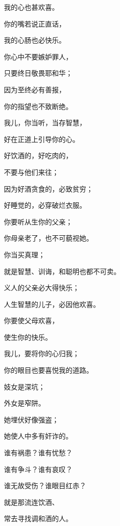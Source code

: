 {\par }{\Q 我的心也甚欢喜。
\par }{\Q {}你的嘴若说正直话，
\par }{\Q 我的心肠也必快乐。
\par }{\BB \par }{\Q {}你心中不要嫉妒罪人，
\par }{\Q 只要终日敬畏耶和华；
\par }{\Q {}因为至终必有善报，
\par }{\Q 你的指望也不致断绝。
\par }{\BB \par }{\Q {}我儿，你当听，当存智慧，
\par }{\Q 好在正道上引导你的心。
\par }{\Q {}好饮酒的，好吃肉的，
\par }{\Q 不要与他们来往；
\par }{\Q {}因为好酒贪食的，必致贫穷；
\par }{\Q 好睡觉的，必穿破烂衣服。
\par }{\BB \par }{\Q {}你要听从生你的父亲；
\par }{\Q 你母亲老了，也不可藐视她。
\par }{\Q {}你当买真理；
\par }{\Q 就是智慧、训诲，和聪明也都不可卖。
\par }{\Q {}义人的父亲必大得快乐；
\par }{\Q 人生智慧的儿子，必因他欢喜。
\par }{\Q {}你要使父母欢喜，
\par }{\Q 使生你的快乐。
\par }{\BB \par }{\Q {}我儿，要将你的心归我；
\par }{\Q 你的眼目也要喜悦我的道路。
\par }{\Q {}妓女是深坑；
\par }{\Q 外女是窄阱。
\par }{\Q {}她埋伏好像强盗；
\par }{\Q 她使人中多有奸诈的。
\par }{\BB \par }{\Q {}谁有祸患？谁有忧愁？
\par }{\Q 谁有争斗？谁有哀叹？
\par }{\Q 谁无故受伤？谁眼目红赤？
\par }{\Q {}就是那流连饮酒、
\par }{\Q 常去寻找调和酒的人。
}
